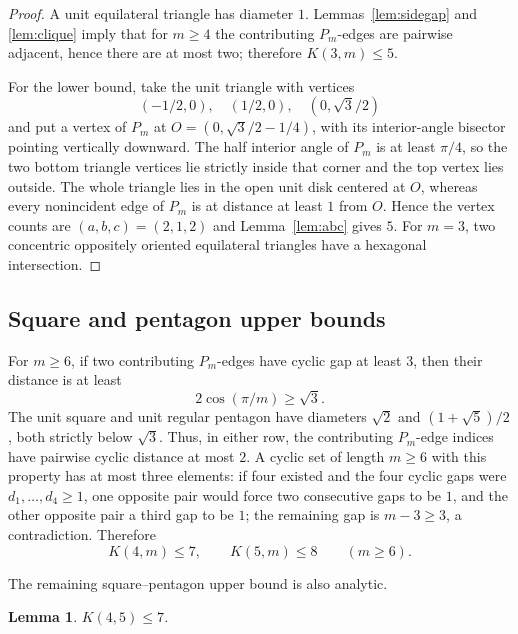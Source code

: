 \documentclass[11pt]{article}
\newtheorem{lemma}[theorem]{Lemma}
\theoremstyle{remark}
\begin{document}
\begin{proof}
A unit equilateral triangle has diameter $1$. Lemmas~\ref{lem:sidegap} and \ref{lem:clique} imply that for $m\ge4$ the contributing $P_m$-edges are pairwise adjacent, hence there are at most two; therefore $K(3,m)\le5$.

For the lower bound, take the unit triangle with vertices
\[
(-1/2,0),\quad(1/2,0),\quad(0,\sqrt3/2)
\]
and put a vertex of $P_m$ at $O=(0,\sqrt3/2-1/4)$, with its interior-angle bisector pointing vertically downward. The half interior angle of $P_m$ is at least $\pi/4$, so the two bottom triangle vertices lie strictly inside that corner and the top vertex lies outside. The whole triangle lies in the open unit disk centered at $O$, whereas every nonincident edge of $P_m$ is at distance at least $1$ from $O$. Hence the vertex counts are $(a,b,c)=(2,1,2)$ and Lemma~\ref{lem:abc} gives $5$. For $m=3$, two concentric oppositely oriented equilateral triangles have a hexagonal intersection.
\end{proof}

\subsection{Square and pentagon upper bounds}

For $m\ge6$, if two contributing $P_m$-edges have cyclic gap at least $3$, then their distance is at least
\[
2\cos(\pi/m)\ge\sqrt3.
\]
The unit square and unit regular pentagon have diameters $\sqrt2$ and $(1+\sqrt5)/2$, both strictly below $\sqrt3$. Thus, in either row, the contributing $P_m$-edge indices have pairwise cyclic distance at most $2$. A cyclic set of length $m\ge6$ with this property has at most three elements: if four existed and the four cyclic gaps were $d_1,\dots,d_4\ge1$, one opposite pair would force two consecutive gaps to be $1$, and the other opposite pair a third gap to be $1$; the remaining gap is $m-3\ge3$, a contradiction. Therefore
\[
K(4,m)\le7,\qquad K(5,m)\le8\qquad(m\ge6).
\tag{3.1}
\]

The remaining square--pentagon upper bound is also analytic.

\begin{lemma}\label{lem:square-pentagon}
$K(4,5)\le7$.
\end{lemma}
\end{document}
